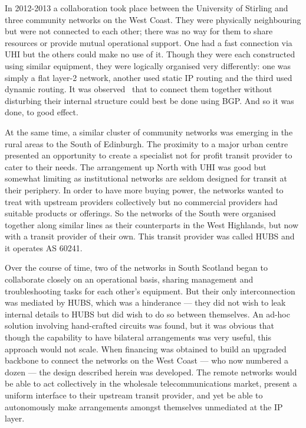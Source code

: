 In 2012-2013 a collaboration took place between the University of
Stirling and three community networks on the West Coast. They were
physically neighbouring but were not connected to each other; there
was no way for them to share resources or provide mutual operational
support. One had a fast connection via \ac{UHI} but the others could
make no use of it. Though they were each constructed using similar
equipment, they were logically organised very differently: one was
simply a flat layer-2 network, another used static IP routing and the
third used dynamic routing. It was observed~\cite{waites2014ripe} that
to connect them together without disturbing their internal structure
could best be done using \ac{BGP}. And so it was done, to good effect.

At the same time, a similar cluster of community networks was emerging
in the rural areas to the South of Edinburgh. The proximity to a major
urban centre presented an opportunity to create a specialist not for
profit transit provider to cater to their needs. The arrangement up
North with \ac{UHI} was good but somewhat limiting as institutional
networks are seldom designed for transit at their periphery. In order
to have more buying power, the networks wanted to treat with upstream
providers collectively but no commercial providers had suitable
products or offerings. So the networks of the South were organised
together along similar lines as their counterparts in the West
Highlands, but now with a transit provider of their own. This transit
provider was called HUBS and it operates \ac{AS} 60241.

Over the course of time, two of the networks in South Scotland began
to collaborate closely on an operational basis, sharing management and
troubleshooting tasks for each other's equipment. But their only
interconnection was mediated by HUBS, which was a hinderance --- they
did not wish to leak internal details to HUBS but did wish to do so
between themselves. An ad-hoc solution involving hand-crafted circuits
was found, but it was obvious that though the capability to have
bilateral arrangements was very useful, this approach would not scale.
When financing was obtained to build an upgraded backbone to connect
the networks on the West Coast --- who now numbered a dozen --- the
design described herein was developed. The remote networks would be
able to act collectively in the wholesale telecommunications market,
present a uniform interface to their upstream transit provider, and
yet be able to autonomously make arrangements amongst themselves
unmediated at the IP layer.
